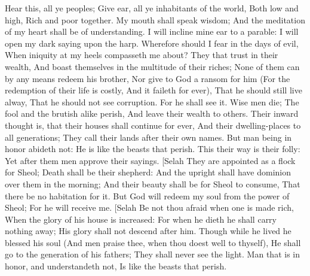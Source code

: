 Hear this, all ye peoples; Give ear, all ye inhabitants of the world,  Both low and high, Rich and poor together.  My mouth shall speak wisdom; And the meditation of my heart shall be of understanding.  I will incline mine ear to a parable: I will open my dark saying upon the harp.  Wherefore should I fear in the days of evil, When iniquity at my heels compasseth me about?  They that trust in their wealth, And boast themselves in the multitude of their riches;  None of them can by any means redeem his brother, Nor give to God a ransom for him  (For the redemption of their life is costly, And it faileth for ever),  That he should still live alway, That he should not see corruption.  For he shall see it. Wise men die; The fool and the brutish alike perish, And leave their wealth to others.  Their inward thought is, that their houses shall continue for ever, And their dwelling-places to all generations; They call their lands after their own names.  But man being in honor abideth not: He is like the beasts that perish.  This their way is their folly: Yet after them men approve their sayings. [Selah  They are appointed as a flock for Sheol; Death shall be their shepherd: And the upright shall have dominion over them in the morning; And their beauty shall be for Sheol to consume, That there be no habitation for it.  But God will redeem my soul from the power of Sheol; For he will receive me. [Selah  Be not thou afraid when one is made rich, When the glory of his house is increased:  For when he dieth he shall carry nothing away; His glory shall not descend after him.  Though while he lived he blessed his soul (And men praise thee, when thou doest well to thyself),  He shall go to the generation of his fathers; They shall never see the light.  Man that is in honor, and understandeth not, Is like the beasts that perish. 

